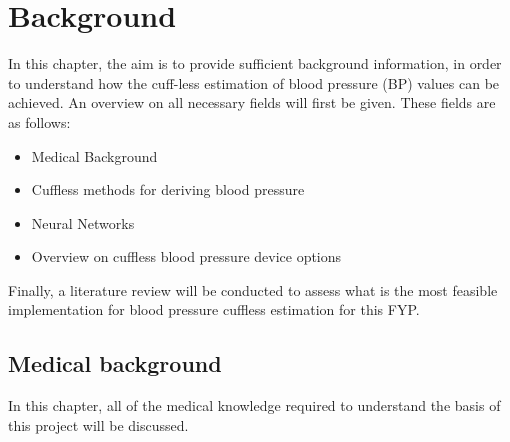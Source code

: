 \section{Background}

In this chapter, the aim is to provide sufficient background information, in order to understand how the cuff-less estimation of blood pressure (BP) values 
can be achieved. An overview on all necessary fields will first be given. These fields are as follows:
\begin{itemize}
  \item Medical Background
  \item Cuffless methods for deriving blood pressure
  \item Neural Networks
  \item Overview on cuffless blood pressure device options
\end{itemize}\noindent Finally, a literature review will be conducted to 
assess what is the most feasible implementation for blood pressure cuffless estimation for this FYP.

\subsection{Medical background}
In this chapter, all of the medical knowledge required to 
understand the basis of this project will be discussed.

